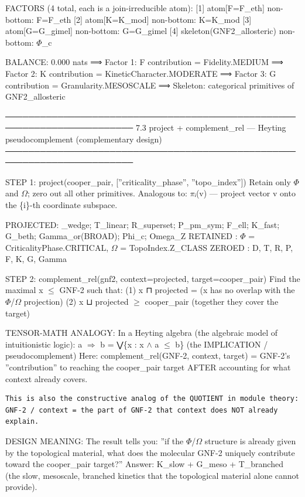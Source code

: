 \documentclass[12pt,a4paper]{article}
\begin{document}
FACTORS (4 total, each is a join-irreducible atom):
{[}1{]} atom{[}F=F\_eth{]}                   non-bottom: F=F\_eth
{[}2{]} atom{[}K=K\_mod{]}                   non-bottom: K=K\_mod
{[}3{]} atom{[}G=G\_gimel{]}                 non-bottom: G=G\_gimel
{[}4{]} skeleton(GNF2\_allosteric)       non-bottom: $\Phi$\_c

\xi BALANCE: 0.000 nats
⟹    Factor 1: F contribution = Fidelity.MEDIUM
⟹    Factor 2: K contribution = KineticCharacter.MODERATE
⟹    Factor 3: G contribution = Granularity.MESOSCALE
⟹    Skeleton: categorical primitives of GNF2\_allosteric

────────────────────────────────────────────────────────────────────────
7.3  project + complement\_rel --- Heyting pseudocomplement (complementary design)
────────────────────────────────────────────────────────────────────────

STEP 1: project(cooper\_pair, {[}''criticality\_phase'', ''topo\_index''{]})
Retain only $\Phi$ and $\Omega$; zero out all other primitives.
Analogous to: $\pi$ᵢ(v) --- project vector v onto the \{i\}-th coordinate subspace.

PROJECTED: \langleD\_wedge; T\_linear; R\_superset; P\_pm\_sym; F\_ell; K\_fast; G\_beth; Gamma\_or(BROAD); Phi\_c; Omega\_Z\rangle
RETAINED : $\Phi$ = CriticalityPhase.CRITICAL, $\Omega$ = TopoIndex.Z\_CLASS
ZEROED   : D, T, R, P, F, K, G, Gamma

STEP 2: complement\_rel(gnf2, context=projected, target=cooper\_pair)
Find the maximal x $\leq$ GNF-2 such that:
(1) x ⊓ projected = \perp   (x has no overlap with the $\Phi$/$\Omega$ projection)
(2) x ⊔ projected $\geq$ cooper\_pair  (together they cover the target)

TENSOR-MATH ANALOGY:
In a Heyting algebra (the algebraic model of intuitionistic logic):
a $\Rightarrow$ b  =  ⋁\{x : x $\land$ a $\leq$ b\}   (the IMPLICATION / pseudocomplement)
Here: complement\_rel(GNF-2, context, target) = GNF-2's ''contribution''
to reaching the cooper\_pair target AFTER accounting for what context already covers.

\begin{lstlisting}
This is also the constructive analog of the QUOTIENT in module theory:
GNF-2 / context = the part of GNF-2 that context does NOT already explain.
\end{lstlisting}

DESIGN MEANING:
The result tells you: ''if the $\Phi$/$\Omega$ structure is already given by the
topological material, what does the molecular GNF-2 uniquely contribute
toward the cooper\_pair target?''
Answer: K\_slow + G\_meso + T\_branched (the slow, mesoscale, branched kinetics
that the topological material alone cannot provide).
\end{document}
